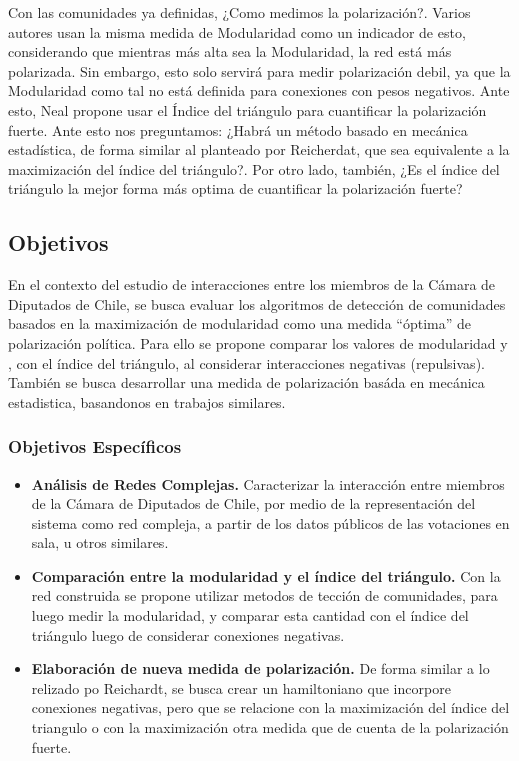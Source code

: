 \documentclass{proyectotesis}
\begin{document}
Con las comunidades ya definidas, ¿Como medimos la polarización?. Varios autores usan la misma medida de Modularidad como un indicador de esto, considerando que mientras más alta sea la Modularidad, la red está más polarizada. Sin embargo, esto solo servirá para medir polarización debil, ya que la Modularidad como tal no está definida para conexiones con pesos negativos. Ante esto, Neal propone usar el Índice del triángulo para cuantificar la polarización fuerte. Ante esto nos preguntamos: ¿Habrá un método basado en mecánica estadística, de forma similar al planteado por Reicherdat, que sea equivalente a la maximización del índice del triángulo?. Por otro lado, también, ¿Es el índice del triángulo la mejor forma más optima de cuantificar la polarización fuerte?

\subsection{Objetivos}

En el contexto del estudio de interacciones entre los miembros de la Cámara de Diputados de Chile, se busca evaluar los algoritmos de detección de comunidades basados en la maximización de modularidad como una medida ``óptima'' de polarización política. Para ello se propone comparar los valores de modularidad y , con el índice del triángulo, al considerar interacciones negativas (repulsivas). 
También se busca desarrollar una medida de polarización basáda en mecánica estadistica, basandonos en trabajos similares.

\subsubsection*{Objetivos Específicos}
\begin{itemize}
\item    {\bf Análisis de Redes Complejas.} Caracterizar la interacción entre miembros de la Cámara de Diputados de Chile, por medio de la representación del sistema como red compleja, a partir de los datos públicos de las votaciones en sala, u otros similares.

\item{\bf Comparación entre la modularidad y el índice del triángulo.} Con la red construida se propone utilizar metodos de tección de comunidades, para luego medir la modularidad, y comparar esta cantidad con el índice del triángulo luego de considerar conexiones negativas. 

\item {\bf Elaboración de nueva medida de polarización.} De forma similar a lo relizado po Reichardt, se busca crear un hamiltoniano que incorpore conexiones negativas, pero que se relacione con la maximización del índice del triangulo o con la maximización otra medida que de cuenta de la polarización fuerte.

\end{itemize}
\end{document}

